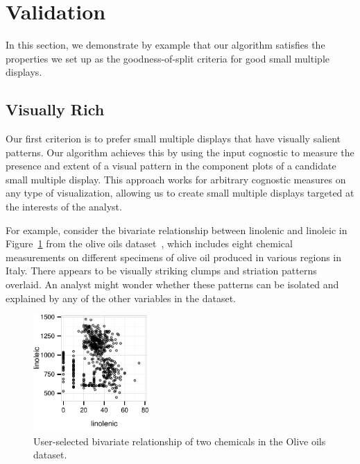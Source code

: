 \section{Validation}
\label{sec:evaluation}
In this section, we demonstrate by example that our algorithm satisfies the properties we set up as the goodness-of-split criteria for good small multiple displays.


\subsection{Visually Rich}
Our first criterion is to prefer small multiple displays that have visually salient patterns. Our algorithm achieves this by using the input cognostic to measure the presence and extent of a visual pattern in the component plots of a candidate small multiple display. This approach works for arbitrary cognostic measures on any type of visualization, allowing us to create small multiple displays targeted at the interests of the analyst. 

For example, consider the bivariate relationship between linolenic and linoleic in Figure~\ref{fig:vrich_all} from the olive oils dataset~\cite{Forina1983}, which includes eight chemical measurements on different specimens of olive oil produced in various regions in Italy. There appears to be visually striking clumps and striation patterns overlaid. An analyst might wonder whether these patterns can be isolated and explained by any of the other variables in the dataset.

\begin{figure}
 \centering 
	\includegraphics[width=1.75in]{images/linolenic-linoleic.pdf}
	  \caption{User-selected bivariate relationship of two chemicals in the Olive oils dataset. }
	 \label{fig:vrich_all}
\end{figure}

